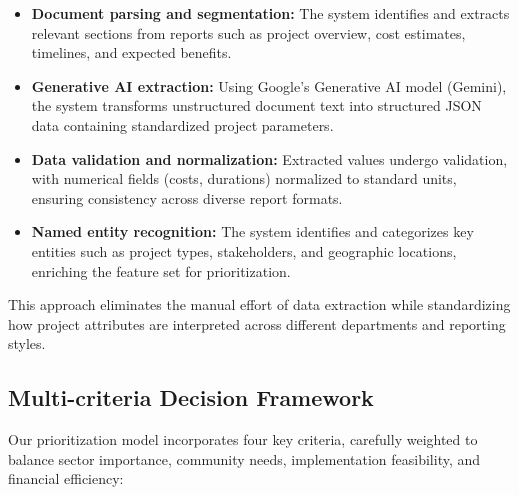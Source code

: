\documentclass[12pt,a4paper]{report}
\begin{document}
\begin{itemize}
    \item \textbf{Document parsing and segmentation:} The system identifies and extracts relevant sections from reports such as project overview, cost estimates, timelines, and expected benefits.
    
    \item \textbf{Generative AI extraction:} Using Google's Generative AI model (Gemini), the system transforms unstructured document text into structured JSON data containing standardized project parameters.
    
    \item \textbf{Data validation and normalization:} Extracted values undergo validation, with numerical fields (costs, durations) normalized to standard units, ensuring consistency across diverse report formats.
    
    \item \textbf{Named entity recognition:} The system identifies and categorizes key entities such as project types, stakeholders, and geographic locations, enriching the feature set for prioritization.
\end{itemize}

\noindent This approach eliminates the manual effort of data extraction while standardizing how project attributes are interpreted across different departments and reporting styles.

\subsection{Multi-criteria Decision Framework}
\indent \indent Our prioritization model incorporates four key criteria, carefully weighted to balance sector importance, community needs, implementation feasibility, and financial efficiency:
\end{document}
